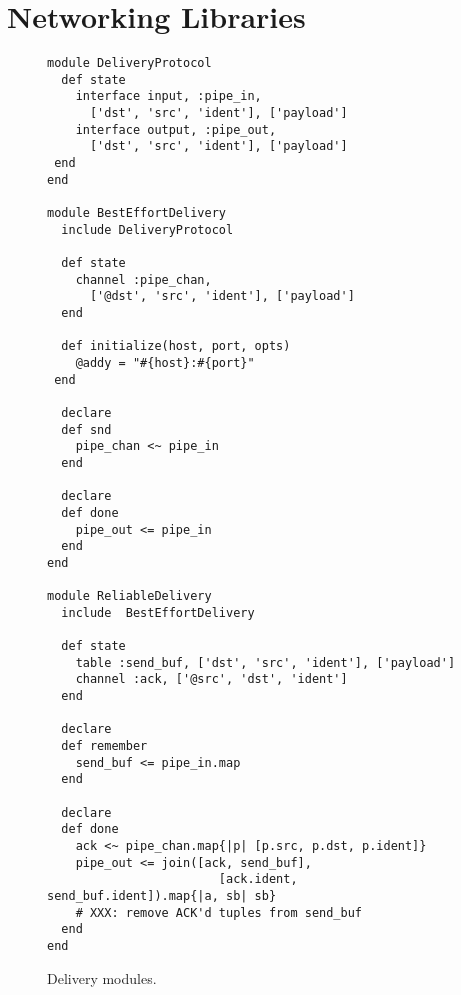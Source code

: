 \section{Networking Libraries}
\label{app:network-code}

\begin{figure}[t]
\begin{scriptsize}
\begin{lstlisting}
module DeliveryProtocol
  def state
    interface input, :pipe_in,
      ['dst', 'src', 'ident'], ['payload']
    interface output, :pipe_out,
      ['dst', 'src', 'ident'], ['payload']
 end
end

module BestEffortDelivery
  include DeliveryProtocol

  def state
    channel :pipe_chan,
      ['@dst', 'src', 'ident'], ['payload']
  end

  def initialize(host, port, opts)
    @addy = "#{host}:#{port}"
 end

  declare
  def snd
    pipe_chan <~ pipe_in
  end

  declare
  def done
    pipe_out <= pipe_in
  end
end

module ReliableDelivery
  include  BestEffortDelivery

  def state
    table :send_buf, ['dst', 'src', 'ident'], ['payload']
    channel :ack, ['@src', 'dst', 'ident']
  end

  declare
  def remember
    send_buf <= pipe_in.map
  end

  declare
  def done
    ack <~ pipe_chan.map{|p| [p.src, p.dst, p.ident]}
    pipe_out <= join([ack, send_buf],
                        [ack.ident, send_buf.ident]).map{|a, sb| sb}
    # XXX: remove ACK'd tuples from send_buf
  end
end
\end{lstlisting}
\centering
\vspace{-10pt}
\caption{Delivery modules.}
\label{fig:delivery-impl}
\end{scriptsize}
\vspace{-2pt}
\end{figure}



